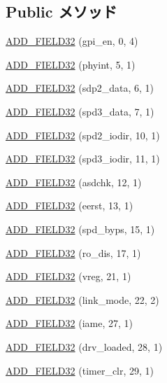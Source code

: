 \subsection*{Public メソッド}
\begin{DoxyCompactItemize}
\item 
\hyperlink{structiGbReg_1_1Regs_1_1CTRL__EXT_a4c5d66f4397bc90d6f853031c67ef9cd}{ADD\_\-FIELD32} (gpi\_\-en, 0, 4)
\item 
\hyperlink{structiGbReg_1_1Regs_1_1CTRL__EXT_a8dd60ff9f975b2c50e4aebc366d2e3d5}{ADD\_\-FIELD32} (phyint, 5, 1)
\item 
\hyperlink{structiGbReg_1_1Regs_1_1CTRL__EXT_a3e042b017ea3d63adb32eecd4c1dbb8f}{ADD\_\-FIELD32} (sdp2\_\-data, 6, 1)
\item 
\hyperlink{structiGbReg_1_1Regs_1_1CTRL__EXT_aa95746ae5043e4eaf4b8c6bb01b55d6a}{ADD\_\-FIELD32} (spd3\_\-data, 7, 1)
\item 
\hyperlink{structiGbReg_1_1Regs_1_1CTRL__EXT_a7bc823e0efc982e374faec56c3514eed}{ADD\_\-FIELD32} (spd2\_\-iodir, 10, 1)
\item 
\hyperlink{structiGbReg_1_1Regs_1_1CTRL__EXT_a97c0b94ecd2f8436ac3ca193a9c52e48}{ADD\_\-FIELD32} (spd3\_\-iodir, 11, 1)
\item 
\hyperlink{structiGbReg_1_1Regs_1_1CTRL__EXT_a05b8d873cd67c82819d43dc278aa43a9}{ADD\_\-FIELD32} (asdchk, 12, 1)
\item 
\hyperlink{structiGbReg_1_1Regs_1_1CTRL__EXT_abf12ce289e336c67f12009f49af4524c}{ADD\_\-FIELD32} (eerst, 13, 1)
\item 
\hyperlink{structiGbReg_1_1Regs_1_1CTRL__EXT_abb7bfb8bcb725dc502dd379e81f19eac}{ADD\_\-FIELD32} (spd\_\-byps, 15, 1)
\item 
\hyperlink{structiGbReg_1_1Regs_1_1CTRL__EXT_a02c9e7cb71730abff7fe18d092a89bdd}{ADD\_\-FIELD32} (ro\_\-dis, 17, 1)
\item 
\hyperlink{structiGbReg_1_1Regs_1_1CTRL__EXT_a583a88c96e86d92f302b459d8aa26bad}{ADD\_\-FIELD32} (vreg, 21, 1)
\item 
\hyperlink{structiGbReg_1_1Regs_1_1CTRL__EXT_a23cce2318638af12722b6d64bd5355fc}{ADD\_\-FIELD32} (link\_\-mode, 22, 2)
\item 
\hyperlink{structiGbReg_1_1Regs_1_1CTRL__EXT_a018a15f75a8db023252214b449e226b4}{ADD\_\-FIELD32} (iame, 27, 1)
\item 
\hyperlink{structiGbReg_1_1Regs_1_1CTRL__EXT_a5723b11bd5775a0cd2897a28f4ed2090}{ADD\_\-FIELD32} (drv\_\-loaded, 28, 1)
\item 
\hyperlink{structiGbReg_1_1Regs_1_1CTRL__EXT_a340ce2081a8d52210b6b97805db375cc}{ADD\_\-FIELD32} (timer\_\-clr, 29, 1)
\end{DoxyCompactItemize}


